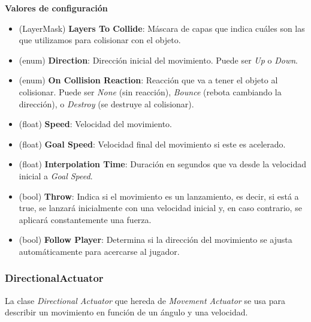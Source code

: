 \textbf{Valores de configuración}
\begin{itemize}
	\item (LayerMask) \textbf{Layers To Collide}: Máscara de capas que indica cuáles son las que utilizamos para colisionar con el objeto.
	\item (enum) \textbf{Direction}: Dirección inicial del movimiento. Puede ser \textit{Up} o \textit{Down}.
	\item (enum) \textbf{On Collision Reaction}: Reacción que va a tener el objeto al colisionar. Puede ser \textit{None} (sin reacción), \textit{Bounce} (rebota cambiando la dirección), o \textit{Destroy} (se destruye al colisionar).
	\item (float) \textbf{Speed}: Velocidad del movimiento.
	\item (float) \textbf{Goal Speed}: Velocidad final del movimiento si este es acelerado.
	\item (float) \textbf{Interpolation Time}: Duración en segundos que va desde la velocidad inicial a \textit{Goal Speed}.
	\item (bool) \textbf{Throw}: Indica si el movimiento es un lanzamiento, es decir, si está a true, se lanzará inicialmente con una velocidad inicial y, en caso contrario, se aplicará constantemente una fuerza.
	\item (bool) \textbf{Follow Player}: Determina si la dirección del movimiento se ajusta automáticamente para acercarse al jugador.
\end{itemize}

\subsubsection{DirectionalActuator}
La clase \textit{Directional Actuator} que hereda de \textit{Movement Actuator} se usa para describir un movimiento en función de un ángulo y una velocidad.\\

